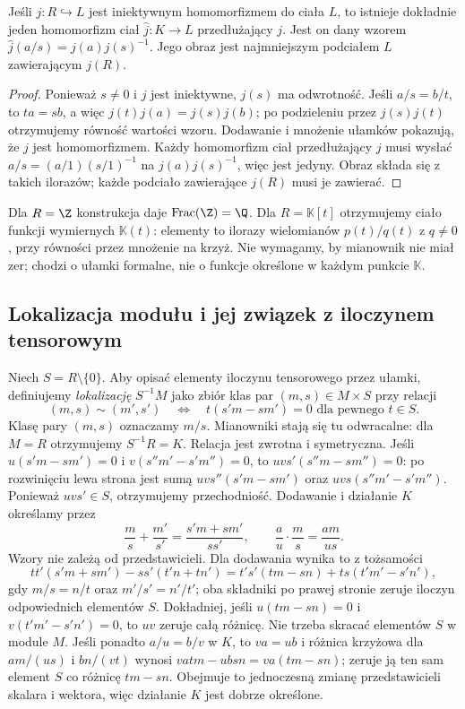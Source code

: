 \begin{stwierdzenie}
Jeśli $j:R\hookrightarrow L$ jest iniektywnym homomorfizmem
do ciała $L$, to istnieje dokładnie jeden homomorfizm ciał
$\widehat j:K\to L$ przedłużający $j$. Jest on dany wzorem
$\widehat j(a/s)=j(a)j(s)^{-1}$.
Jego obraz jest najmniejszym podciałem $L$ zawierającym $j(R)$.
\end{stwierdzenie}
\begin{proof}
Ponieważ $s\ne0$ i $j$ jest iniektywne, $j(s)$ ma odwrotność.
Jeśli $a/s=b/t$, to $ta=sb$, a więc
$j(t)j(a)=j(s)j(b)$; po podzieleniu przez $j(s)j(t)$
otrzymujemy równość wartości wzoru. Dodawanie i mnożenie
ułamków pokazują, że $\widehat j$ jest homomorfizmem.
Każdy homomorfizm ciał przedłużający $j$ musi wysłać
$a/s=(a/1)(s/1)^{-1}$ na $j(a)j(s)^{-1}$,
więc jest jedyny. Obraz składa się z takich ilorazów;
każde podciało zawierające $j(R)$ musi je zawierać.
\end{proof}

\begin{przyklad}
Dla $R=\Z$ konstrukcja daje $\operatorname{Frac}(\Z)=\Q$.
Dla $R=\mathbb K[t]$ otrzymujemy ciało funkcji wymiernych
$\mathbb K(t)$: elementy to ilorazy wielomianów $p(t)/q(t)$ z
$q\ne0$, przy równości przez mnożenie na krzyż. Nie wymagamy,
by mianownik nie miał zer; chodzi o ułamki formalne, nie o funkcje
określone w każdym punkcie $\mathbb K$.
\end{przyklad}

\subsection*{Lokalizacja modułu i jej związek z iloczynem tensorowym}

Niech $S=R\setminus\{0\}$. Aby opisać elementy iloczynu tensorowego przez
ułamki, definiujemy \emph{lokalizację} $S^{-1}M$ jako zbiór klas
par $(m,s)\in M\times S$ przy relacji
\[
(m,s)\sim(m',s')
\quad\Longleftrightarrow\quad
t(s'm-sm')=0\text{ dla pewnego }t\in S.
\]
Klasę pary $(m,s)$ oznaczamy $m/s$. Mianowniki stają się tu
odwracalne: dla $M=R$ otrzymujemy $S^{-1}R=K$.
Relacja jest zwrotna i symetryczna. Jeśli
$u(s'm-sm')=0$ i $v(s''m'-s'm'')=0$, to
$uvs'(s''m-sm'')=0$: po rozwinięciu lewa strona
jest sumą $uvs''(s'm-sm')$ oraz
$uvs(s''m'-s'm'')$. Ponieważ $uvs'\in S$,
otrzymujemy przechodniość.
Dodawanie i działanie $K$ określamy przez
\[
\frac{m}{s}+\frac{m'}{s'}=\frac{s'm+sm'}{ss'},
\qquad
\frac{a}{u}\cdot\frac{m}{s}=\frac{am}{us}.
\]
Wzory nie zależą od przedstawicieli. Dla dodawania wynika to
z tożsamości
\[
tt'(s'm+sm')-ss'(t'n+tn')
=t's'(tm-sn)+ts(t'm'-s'n'),
\]
gdy $m/s=n/t$ oraz $m'/s'=n'/t'$; oba składniki po prawej
stronie zeruje iloczyn odpowiednich elementów $S$.
Dokładniej, jeśli $u(tm-sn)=0$ i $v(t'm'-s'n')=0$,
to $uv$ zeruje całą różnicę. Nie trzeba skracać elementów
$S$ w module $M$.
Jeśli ponadto $a/u=b/v$ w $K$, to $va=ub$ i różnica
krzyżowa dla $am/(us)$ i $bn/(vt)$ wynosi
$v a t m-u b s n=v a(t m-s n)$; zeruje ją ten sam element $S$
co różnicę $t m-s n$. Obejmuje to jednoczesną zmianę
przedstawicieli skalara i wektora, więc działanie $K$
jest dobrze określone.

